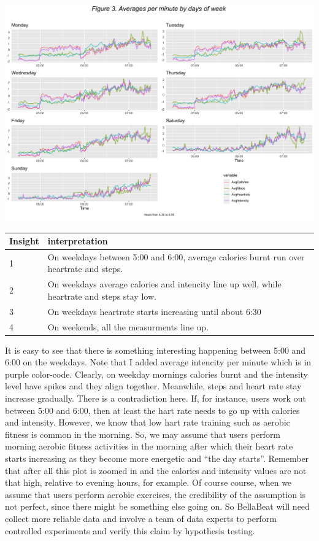 \documentclass[
]{article}
\begin{document}
\begin{center}\includegraphics[width=1.1\linewidth]{./figs/lineplots2} \end{center}

\begin{table}
\centering\begingroup\fontsize{14}{16}\selectfont

\begin{tabular}[t]{l|l}
\hline
Insight & interpretation\\
\hline
1 & On weekdays between 5:00 and 6:00, average calories burnt run over heartrate and steps.\\
\hline
2 & On weekdays average calories and intencity line up well, while heartrate and steps stay low.\\
\hline
3 & On weekdays heartrate starts increasing until about 6:30\\
\hline
4 & On weekends, all the measurments line up.\\
\hline
\end{tabular}
\endgroup{}
\end{table}

It is easy to see that there is something interesting happening between
5:00 and 6:00 on the weekdays. Note that I added average intencity per
minute which is in purple color-code. Clearly, on weekday mornings
calories burnt and the intensity level have spikes and they align
together. Meanwhile, steps and heart rate stay increase gradually. There
is a contradiction here. If, for instance, users work out between 5:00
and 6:00, then at least the hart rate needs to go up with calories and
intensity. However, we know that low hart rate training such as aerobic
fitness is common in the morning. So, we may assume that users perform
morning aerobic fitness activities in the morning after which their
heart rate starts increasing as they become more energetic and ``the day
starts''. Remember that after all this plot is zoomed in and the
calories and intensity values are not that high, relative to evening
hours, for example. Of course course, when we assume that users perform
aerobic exercises, the credibility of the assumption is not perfect,
since there might be something else going on. So BellaBeat will need
collect more reliable data and involve a team of data experts to perform
controlled experiments and verify this claim by hypothesis testing.
\end{document}
